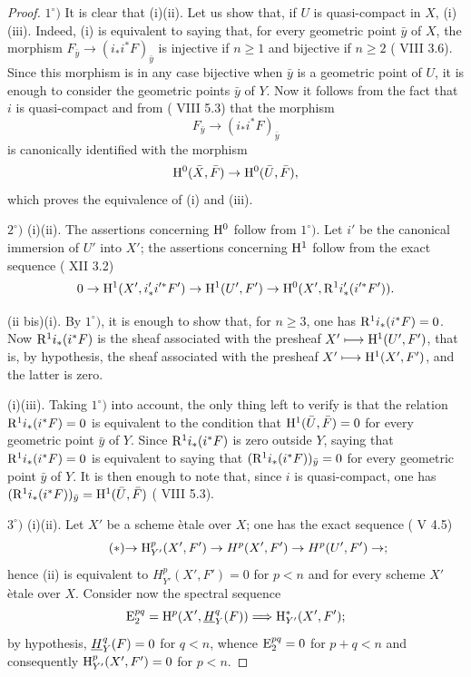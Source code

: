 \skpt
\begin{proof}
$1^\circ)$ It is clear that \textup{(i)}\SSI \textup{(ii)}.
Let us show that, if $U$ is quasi-compact in $X$, \textup{(i)}\SSI
\textup{(iii)}. Indeed, \textup{(i)} is equivalent to saying that, for
every geometric point $\bar{y}$ of $X$, the morphism
$F_{\bar{y}}\to (i_*i^*F)_{\bar{y}}$ is injective if $n\geq 1$ and
bijective if $n\geq 2$ ( VIII 3.6). Since this morphism is in
any case bijective when $\bar{y}$ is a geometric point of $U$, it is
enough to consider the geometric points $\bar{y}$ of $Y$. Now it
follows from the fact that $i$ is quasi-compact and from
( VIII 5.3) that the morphism
$$F_{\bar{y}}\to (i_*i^*F)_{\bar{y}}$$
is canonically identified with the morphism
$$
\mathrm H^0(\bar{X}, \bar{F})\to \mathrm H^0(\bar{U}, \bar{F}),
$$
which proves the equivalence of \textup{(i)} and \textup{(iii)}.

$2^\circ)$ \textup{(i)}\ALORS \textup{(ii)}. The assertions concerning $\mathrm H^0$ follow from $1^\circ)$. Let $i'$ be the canonical immersion of $U'$ into $X'$; the assertions concerning $\mathrm H^1$ follow from the exact sequence ( XII 3.2)
$$0\to \mathrm H^1(X', i'_*i'^*F')\to \mathrm H^1(U', F')\to \mathrm H^0(X', \mathrm R^1i'_*(i'^*F')).
$$

(ii bis)\ALORS \textup{(i)}\pageoriginale. By $1^\circ)$, it is enough to show that, for $n\geq 3$, one has $\mathrm R^1i_*(i^*F)=0$. Now $\mathrm R^1i_*(i^*F)$ is the sheaf associated with the presheaf $X'\longmapsto \mathrm H^1(U', F')$, that is, by hypothesis, the sheaf associated with the presheaf $X'\longmapsto \mathrm H^1(X', F')$, and the latter is zero.

\textup{(i)}\SSI \textup{(iii)}. Taking $1^\circ)$ into account, the only thing left to verify is that the relation $\mathrm R^1i_*(i^*F)=0$ is equivalent to the condition that $\mathrm H^1(\bar U, \bar F)=0$ for every geometric point $\bar y$ of $Y$. Since $\mathrm R^1i_*(i^*F)$ is zero outside $Y$, saying that $\mathrm R^1i_*(i^*F)=0$ is equivalent to saying that $(\mathrm R^1i_*(i^*F))_{\bar y}=0$ for every geometric point $\bar y$ of $Y$. It is then enough to note that, since $i$ is quasi-compact, one has $(\mathrm R^1i_*(i^*F))_{\bar y}=\mathrm H^1(\bar U, \bar F)$ ( VIII 5.3).

$3^\circ)$ \textup{(i)}\ALORS \textup{(ii)}. Let $X'$ be a scheme \`etale over $X$; one has the exact sequence ( V 4.5)
\begin{equation*} \label{eq:XIV.1.1.*} \tag{$*$} {\to \mathrm H^p_{Y'}(X', F')\to H^p(X', F')\to H^p(U', F')\to};
\end{equation*}
hence \textup{(ii)} is equivalent to $H^p_{Y'}(X', F')=0$ for $p<n$ and for every scheme $X'$ \`etale over $X$. Consider now the spectral sequence
$$
\operatorname{E}_2^{pq}=\mathrm H^p(X', {\mathop{\underline{H}}\nolimits}_Y^q(F))\Longrightarrow \mathrm H_{Y'}^*(X', F');$$
by hypothesis, ${\mathop{\underline{H}}\nolimits}_Y^q(F)=0$ for $q<n$, whence $\operatorname{E}_2^{pq}=0$ for $p+q<n$ and consequently $\mathrm H_{Y'}^p(X', F')=0$ for $p<n$.


\end{proof}
